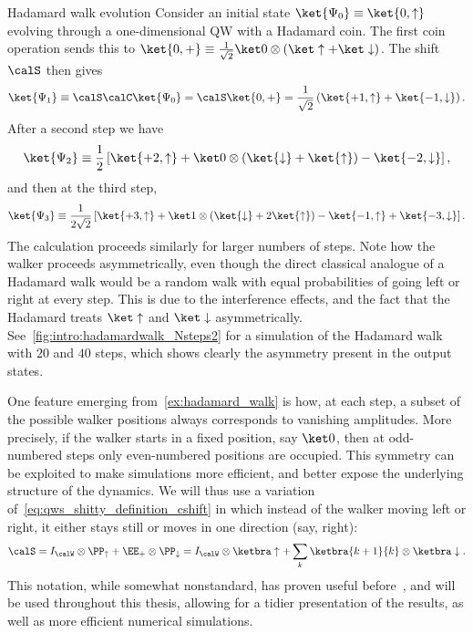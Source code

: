\begin{examplebox}[label=ex:hadamard_walk]{Hadamard walk evolution}
Consider an initial state $\ket{\Psi_0}\equiv\ket{0,\uparrow}$ evolving through a one-dimensional QW with a Hadamard coin.
The first coin operation sends this to $\ket{0,+}\equiv\frac{1}{\sqrt2}\ket0\otimes(\ket\uparrow+\ket\downarrow)$. The shift $\calS$ then gives
\begin{equation}
    \ket{\Psi_1} \equiv 
    \calS\calC\ket{\Psi_0} =
    \calS\ket{0,+} =
    \frac{1}{\sqrt2} \left( \ket{+1,\uparrow} + \ket{-1,\downarrow} \right).
\end{equation}
After a second step we have
\begin{equation}
    \ket{\Psi_2} \equiv
    \frac12\left[
        \ket{+2,\uparrow} +
        \ket0\otimes(\ket{\downarrow}
        + \ket{\uparrow})
        - \ket{-2,\downarrow}
    \right],
\end{equation}
and then at the third step,
\begin{equation}
    \ket{\Psi_3} \equiv
    \frac{1}{2\sqrt2}\left[
        \ket{+3,\uparrow} +
        \ket1\otimes (\ket{\downarrow} + 2\ket{\uparrow})
        - \ket{-1,\uparrow}
        + \ket{-3,\downarrow}
    \right].
\end{equation}
The calculation proceeds similarly for larger numbers of steps.
Note how the walker proceeds asymmetrically, even though the direct classical analogue of a Hadamard walk would be a random walk with equal probabilities of going left or right at every step.
This is due to the interference effects, and the fact that the Hadamard treats $\ket\uparrow$ and $\ket\downarrow$ asymmetrically.
See~\cref{fig:intro:hadamardwalk_Nsteps2} for a simulation of the Hadamard walk with $20$ and $40$ steps, which shows clearly the asymmetry present in the output states.
\end{examplebox}

One feature emerging from~\cref{ex:hadamard_walk} is how, at each step, a subset of the possible walker positions always corresponds to vanishing amplitudes. More precisely, if the walker starts in a fixed position, say $\ket0$, then at odd-numbered steps only even-numbered positions are occupied.
This symmetry can be exploited to make simulations more efficient, and better expose the underlying structure of the dynamics.
We will thus use a variation of~\cref{eq:qws_shitty_definition_cshift} in which instead of the walker moving left or right, it either stays still or moves in one direction (say, right):
\begin{equation}
    \calS = I_{\calW}\otimes \PP_\uparrow + \EE_+\otimes \PP_\downarrow
    =
    I_{\calW} \otimes \ketbra\uparrow +
    \sum_k\ketbra{k+1}{k} \otimes \ketbra\downarrow.
\end{equation}
This notation, while somewhat nonstandard, has proven useful before~\cite{hoyer2009faster,montero2013unidirectional,montero2015quantum}, and will be used throughout this thesis, allowing for a tidier presentation of the results, as well as more efficient numerical simulations.

